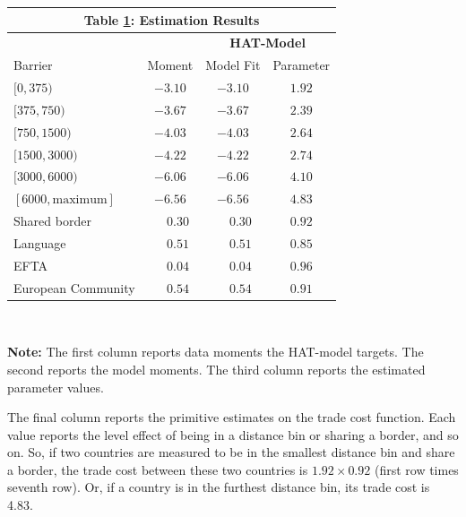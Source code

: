 \documentclass[12pt,pdftex]{article}
\renewcommand{\arraystretch}{1.1}
\begin{document}
\begin{onehalfspacing}
\begin{table}[t]
\small
\begin{center}
\setlength {\tabcolsep}{5.5mm}
\renewcommand{\arraystretch}{1.50}\label{tb-grav-est}
\begin{tabular}[t]{l c c c}
\multicolumn{4}{c}{{\normalsize\textbf{Table \ref{tb-grav-est}: Estimation Results}} }
\\\hline \hline
& & \multicolumn{2}{c}{\textbf{HAT-Model}}  \\
\cmidrule(lr){3-4}
Barrier& Moment & Model Fit & Parameter \\
\hline $[0,375)$                &$-3.10 $           & $-3.10 $              & $1.92$           \\
$[375,750)$                     &$-3.67 $           & $-3.67 $              & $2.39$           \\
$[750,1500)$                    &$-4.03 $           & $-4.03 $              & $2.64$           \\
$[1500,3000)$                   &$-4.22 $           & $-4.22 $              & $2.74$           \\
$[3000,6000)$                   &$-6.06 $           & $-6.06 $              & $4.10$           \\
$[6000,\mbox{maximum}]$         &$-6.56 $           & $-6.56 $              & $4.83$           \\
Shared border                   &$\phantom{-}0.30$  & $\phantom{-}0.30$     & $0.92$  \\
Language                        &$\phantom{-}0.51$  & $\phantom{-}0.51$     & $0.85$  \\
EFTA                            &$\phantom{-}0.04$  & $\phantom{-}0.04$     & $0.96$  \\
European Community              &$\phantom{-}0.54$  & $\phantom{-}0.54$     & $0.91$  \\
\hline
\end{tabular}
\\[0.5ex]
\parbox{5.0in}{\footnotesize \textbf{Note:} The first column reports data moments the HAT-model targets. The second reports the model moments. The third column reports the estimated parameter values.}
\end{center}
\end{table}

The final column reports the primitive estimates on the trade cost function. Each value reports the level effect of being in a distance bin or sharing a border, and so on.  So, if two countries are measured to be in the smallest distance bin and share a border, the trade cost between these two countries is $1.92 \times 0.92$ (first row times seventh row). Or, if a country is in the furthest distance bin, its trade cost is 4.83.


\end{onehalfspacing}
\end{document}
